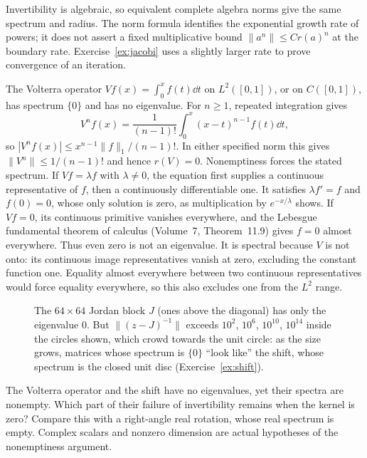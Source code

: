 Invertibility is algebraic, so equivalent complete algebra norms give the same spectrum and radius. The norm formula identifies the exponential growth rate of powers; it does not assert a fixed multiplicative bound $\|a^n\|\le Cr(a)^n$ at the boundary rate. Exercise~\ref{ex:jacobi} uses a slightly larger rate to prove convergence of an iteration.

\begin{example}\label{ex:volterraex}
The Volterra operator $Vf(x)=\int_0^xf(t)\dd t$ on $L^2([0,1])$, or on $C([0,1])$, has spectrum $\{0\}$ and has no eigenvalue.
For $n\ge1$, repeated integration gives
\[
V^nf(x)=\frac1{(n-1)!}\int_0^x(x-t)^{n-1}f(t)\dd t,
\]
so $|V^nf(x)|\le x^{n-1}\|f\|_1/(n-1)!$. In either specified norm this gives $\|V^n\|\le1/(n-1)!$ and hence $r(V)=0$. Nonemptiness forces the stated spectrum.
If $Vf=\lambda f$ with $\lambda\ne0$, the equation first supplies a continuous representative of $f$, then a continuously differentiable one. It satisfies $\lambda f'=f$ and $f(0)=0$, whose only solution is zero, as multiplication by $e^{-x/\lambda}$ shows. If $Vf=0$, its continuous primitive vanishes everywhere, and the Lebesgue fundamental theorem of calculus (Volume~7, Theorem~11.9) gives $f=0$ almost everywhere. Thus even zero is not an eigenvalue. It is spectral because $V$ is not onto: its continuous image representatives vanish at zero, excluding the constant function one. Equality almost everywhere between two continuous representatives would force equality everywhere, so this also excludes one from the $L^2$ range.
\end{example}

\begin{figure}[ht]
\centering
{}
\caption{The $64\times64$ Jordan block $J$ (ones above the diagonal) has only the eigenvalue $0$. But $\|(z-J)^{-1}\|$ exceeds $10^{2}$, $10^{6}$, $10^{10}$, $10^{14}$ inside the circles shown, which crowd towards the unit circle: as the
size grows, matrices whose spectrum is $\{0\}$ ``look like'' the shift, whose spectrum is the closed unit disc (Exercise~\ref{ex:shift}).}
\label{fig:pseudospectra}
\end{figure}

\begin{think}
The Volterra operator and the shift have no eigenvalues, yet their spectra are nonempty. Which part of their failure of invertibility remains when the kernel is zero? Compare this with a right-angle real rotation, whose real spectrum is empty. Complex scalars and nonzero dimension are actual hypotheses of the nonemptiness argument.
\end{think}


